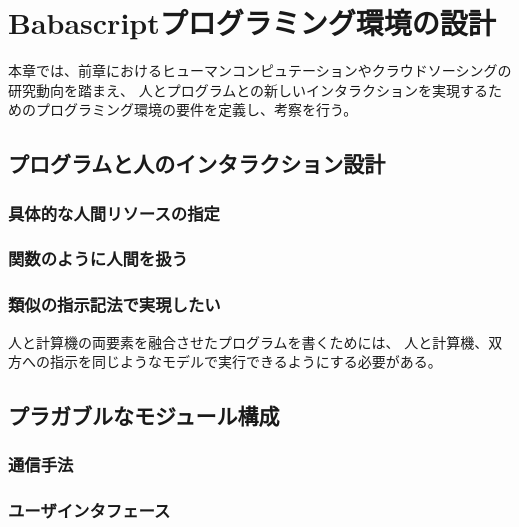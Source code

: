 \chapter{Babascriptプログラミング環境の設計}
\label{chap:design}

本章では、前章におけるヒューマンコンピュテーションやクラウドソーシングの研究動向を踏まえ、
人とプログラムとの新しいインタラクションを実現するためのプログラミング環境の要件を定義し、考察を行う。

\section{プログラムと人のインタラクション設計}\label{ux30d7ux30edux30b0ux30e9ux30e0ux3068ux4ebaux306eux30a4ux30f3ux30bfux30e9ux30afux30b7ux30e7ux30f3ux8a2dux8a08}

\subsection{具体的な人間リソースの指定}\label{ux5177ux4f53ux7684ux306aux4ebaux9593ux30eaux30bdux30fcux30b9ux306eux6307ux5b9a}

\subsection{関数のように人間を扱う}\label{ux95a2ux6570ux306eux3088ux3046ux306bux4ebaux9593ux3092ux6271ux3046}

\subsection{類似の指示記法で実現したい}\label{ux985eux4f3cux306eux6307ux793aux8a18ux6cd5ux3067ux5b9fux73feux3057ux305fux3044}

人と計算機の両要素を融合させたプログラムを書くためには、
人と計算機、双方への指示を同じようなモデルで実行できるようにする必要がある。

\section{プラガブルなモジュール構成}\label{ux30d7ux30e9ux30acux30d6ux30ebux306aux30e2ux30b8ux30e5ux30fcux30ebux69cbux6210}

\subsection{通信手法}\label{ux901aux4fe1ux624bux6cd5}

\subsection{ユーザインタフェース}\label{ux30e6ux30fcux30b6ux30a4ux30f3ux30bfux30d5ux30a7ux30fcux30b9}

